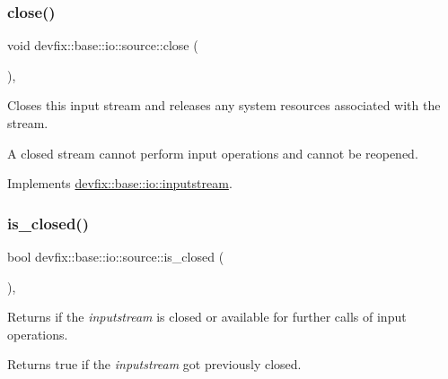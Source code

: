 \mbox{\label{structdevfix_1_1base_1_1io_1_1source_aa00a381c8a166cbbc5dbf6de4b56590e}} 
\subsubsection{\texorpdfstring{close()}{close()}}
{\footnotesize\ttfamily void devfix\+::base\+::io\+::source\+::close (\begin{DoxyParamCaption}{ }\end{DoxyParamCaption})\hspace{0.3cm}{\ttfamily [override]}, {\ttfamily [virtual]}}



Closes this input stream and releases any system resources associated with the stream. 

A closed stream cannot perform input operations and cannot be reopened. 

Implements \hyperlink{structdevfix_1_1base_1_1io_1_1inputstream_a1188eff97757eb9625be91dfeca17af7}{devfix\+::base\+::io\+::inputstream}.

\mbox{\label{structdevfix_1_1base_1_1io_1_1source_a406834cf6651d48949b96d0ef49cc6c1}} 
\subsubsection{\texorpdfstring{is\+\_\+closed()}{is\_closed()}}
{\footnotesize\ttfamily bool devfix\+::base\+::io\+::source\+::is\+\_\+closed (\begin{DoxyParamCaption}{ }\end{DoxyParamCaption})\hspace{0.3cm}{\ttfamily [override]}, {\ttfamily [virtual]}}



Returns if the {\itshape inputstream} is closed or available for further calls of input operations. 

\begin{DoxyReturn}{Returns}
true if the {\itshape inputstream} got previously closed. 
\end{DoxyReturn}


